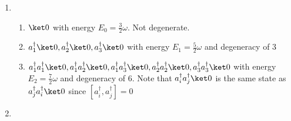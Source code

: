\begin{sol}
\begin{enumerate}[label=\textbf{(\alph*)}]
\item
\begin{enumerate}
\item
$\ket 0$ with energy $E_0=\frac{3}{2}\omega$. Not degenerate.
\item
$a_1^\dagger\ket 0,a_2^\dagger\ket 0,a_3^\dagger\ket 0$ with energy $E_1=\frac{5}{2}\omega$ and degeneracy of $3$
\item
$a_1^\dagger a_1^\dagger\ket 0,a_1^\dagger a_2^\dagger\ket 0,a_1^\dagger a_3^\dagger\ket 0,a_2^\dagger a_2^\dagger\ket 0,a_3^\dagger a_3^\dagger\ket 0$ with energy $E_2=\frac{7}{2}\omega$ and degeneracy of $6$. Note that $a_i^\dagger a_j^\dagger\ket 0$ is the same state as $a_j^\dagger a_i^\dagger\ket 0$ since $[a_i^\dagger, a_j^\dagger]=0$

\end{enumerate}
\item

\end{enumerate}
\end{sol}